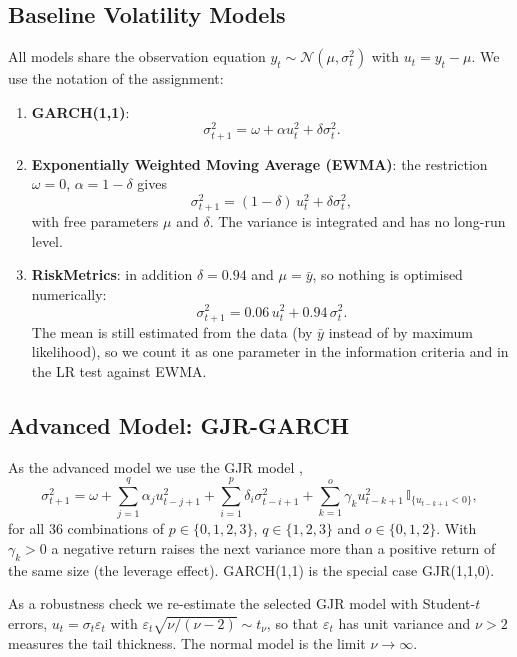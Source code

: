 \documentclass[10pt,a4paper]{article}
\begin{document}
\subsection{Baseline Volatility Models}
All models share the observation equation $y_t \sim \mathcal{N}(\mu, \sigma_t^2)$ with $u_t = y_t - \mu$.
We use the notation of the assignment:
\begin{enumerate}
    \item \textbf{GARCH(1,1)}:
    \begin{equation}
        \sigma_{t+1}^2 = \omega + \alpha u_t^2 + \delta \sigma_t^2 .
    \end{equation}
    \item \textbf{Exponentially Weighted Moving Average (EWMA)}: the restriction $\omega = 0$,
    $\alpha = 1 - \delta$ gives
    \begin{equation}
        \sigma_{t+1}^2 = (1 - \delta)\, u_t^2 + \delta \sigma_t^2 ,
    \end{equation}
    with free parameters $\mu$ and $\delta$. The variance is integrated and has no long-run level.
    \item \textbf{RiskMetrics}: in addition $\delta = 0.94$ and $\mu = \bar y$, so nothing is optimised
    numerically:
    \begin{equation}
        \sigma_{t+1}^2 = 0.06\, u_t^2 + 0.94\, \sigma_t^2 .
    \end{equation}
    The mean is still estimated from the data (by $\bar y$ instead of by maximum likelihood), so we count
    it as one parameter in the information criteria and in the LR test against EWMA.
\end{enumerate}

\subsection{Advanced Model: GJR-GARCH}
As the advanced model we use the GJR model \citep{glosten1993},
\begin{equation}
    \sigma_{t+1}^2 = \omega + \sum_{j=1}^{q}\alpha_j u^2_{t-j+1} + \sum_{i=1}^{p}\delta_i\sigma^2_{t-i+1}
    + \sum_{k=1}^{o}\gamma_k u^2_{t-k+1}\,\mathbb{I}_{\{u_{t-k+1}<0\}},
\end{equation}
for all 36 combinations of $p\in\{0,1,2,3\}$, $q\in\{1,2,3\}$ and $o\in\{0,1,2\}$. With $\gamma_k>0$ a
negative return raises the next variance more than a positive return of the same size (the leverage
effect). GARCH(1,1) is the special case GJR(1,1,0).

As a robustness check we re-estimate the selected GJR model with Student-$t$ errors,
$u_t=\sigma_t\varepsilon_t$ with $\varepsilon_t\sqrt{\nu/(\nu-2)}\sim t_\nu$, so that $\varepsilon_t$ has
unit variance and $\nu>2$ measures the tail thickness. The normal model is the limit $\nu\to\infty$.
\end{document}
